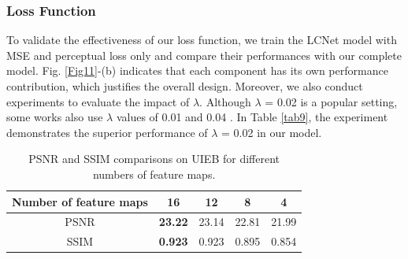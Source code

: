 \documentclass[journal]{IEEEtran}
\begin{document}
\begin{table}[h]
\centering
\caption{Comparison of complexity in terms of model parameters.}

\label{tab8}
\end{table}

\subsubsection{Loss Function}
To validate the effectiveness of our loss function, we train the LCNet model with MSE and perceptual loss only and compare their performances with our complete model. Fig. \ref{Fig11}-(b) indicates that each component has its own performance contribution, which justifies the overall design. Moreover, we also conduct experiments to evaluate the impact of \(\lambda\). Although \(\lambda\) = 0.02 is a popular setting, some works also use \(\lambda\) values of 0.01 and 0.04 \cite{dehazeli2018single,zhou2019spatio}. In Table \ref{tab9}, the experiment demonstrates the superior performance of \(\lambda\) = 0.02 in our model.

\begin{table}[ht]
\centering
\caption{PSNR and SSIM comparisons on UIEB for different values of \(\lambda\).}
\label{tab9} 
\end{table}



\begin{table}[h]
\centering
\caption{PSNR and SSIM comparisons on UIEB for different numbers of feature maps.}
\begin{tabular}{|c|c|c|c|c|} %
\hline 
Number of feature maps&16&12&8&4\\
\hline  
PSNR&\textbf{23.22}&23.14&22.81&21.99\\
\hline 
SSIM&\textbf{0.923}&0.923&0.895&0.854\\
\hline
\end{tabular}
\label{tab10}
\end{table}
\end{document}
